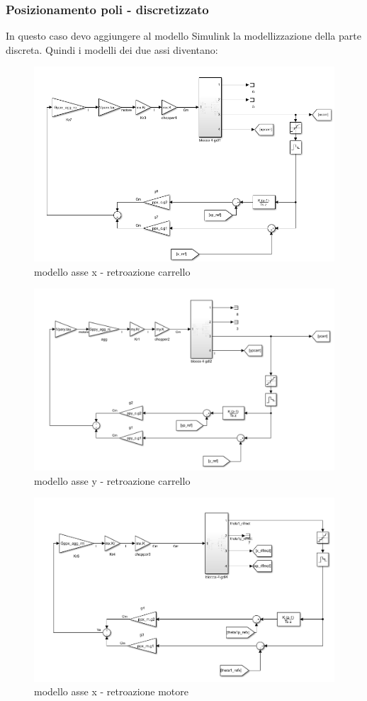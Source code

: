 \documentclass{article}
\begin{document}
\subsubsection{Posizionamento poli - discretizzato}
In questo caso devo aggiungere al modello Simulink la modellizzazione della parte discreta. Quindi i modelli dei due assi diventano:

\begin{figure}[H]
\centering
\includegraphics[width=.9\textwidth]{./strategia_sim/pospolcarx.png} 
\caption{modello asse x - retroazione carrello}
\end{figure}

\begin{figure}[H]
\centering
\includegraphics[width=.9\textwidth]{./strategia_sim/pospolcary.png}
\caption{ modello asse y - retroazione carrello}
\end{figure}

\begin{figure}[H]
\centering
\includegraphics[width=.9\textwidth]{./strategia_sim/pospolmotx.png} 
\caption{modello asse x - retroazione motore}
\end{figure}
\end{document}
